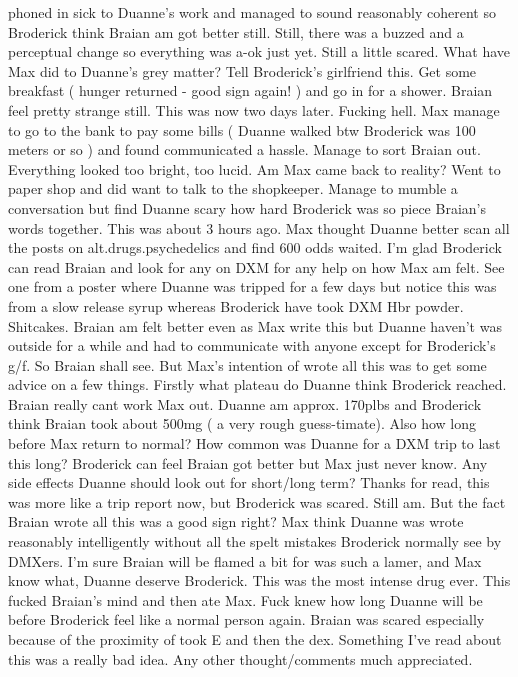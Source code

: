\documentclass[12pt]{book}
\begin{document}
phoned in sick to Duanne's work and managed to sound reasonably coherent so Broderick think Braian am got better still. Still, there was a buzzed and a perceptual change so everything was a-ok just yet. Still a little scared. What have Max did to Duanne's grey matter? Tell Broderick's girlfriend this. Get some breakfast ( hunger returned - good sign again! ) and go in for a shower. Braian feel pretty strange still. This was now two days later. Fucking hell. Max manage to go to the bank to pay some bills ( Duanne walked btw Broderick was 100 meters or so ) and found communicated a hassle. Manage to sort Braian out. Everything looked too bright, too lucid. Am Max came back to reality? Went to paper shop and did want to talk to the shopkeeper. Manage to mumble a conversation but find Duanne scary how hard Broderick was so piece Braian's words together. This was about 3 hours ago. Max thought Duanne better scan all the posts on alt.drugs.psychedelics and find 600 odds waited. I'm glad Broderick can read Braian and look for any on DXM for any help on how Max am felt. See one from a poster where Duanne was tripped for a few days but notice this was from a slow release syrup whereas Broderick have took DXM Hbr powder. Shitcakes. Braian am felt better even as Max write this but Duanne haven't was outside for a while and had to communicate with anyone except for Broderick's g/f. So Braian shall see. But Max's intention of wrote all this was to get some advice on a few things. Firstly what plateau do Duanne think Broderick reached. Braian really cant work Max out. Duanne am approx. 170plbs and Broderick think Braian took about 500mg (  a very rough guess-timate). Also how long before Max return to normal? How common was Duanne for a DXM trip to last this long? Broderick can feel Braian got better but Max just never know. Any side effects Duanne should look out for short/long term? Thanks for read, this was more like a trip report now, but Broderick was scared. Still am. But the fact Braian wrote all this was a good sign right? Max think Duanne was wrote reasonably intelligently without all the spelt mistakes Broderick normally see by DMXers. I'm sure Braian will be flamed a bit for was such a lamer, and Max know what, Duanne deserve Broderick. This was the most intense drug ever. This fucked Braian's mind and then ate Max. Fuck knew how long Duanne will be before Broderick feel like a normal person again. Braian was scared especially because of the proximity of took E and then the dex. Something I've read about this was a really bad idea. Any other thought/comments much appreciated.
\end{document}
